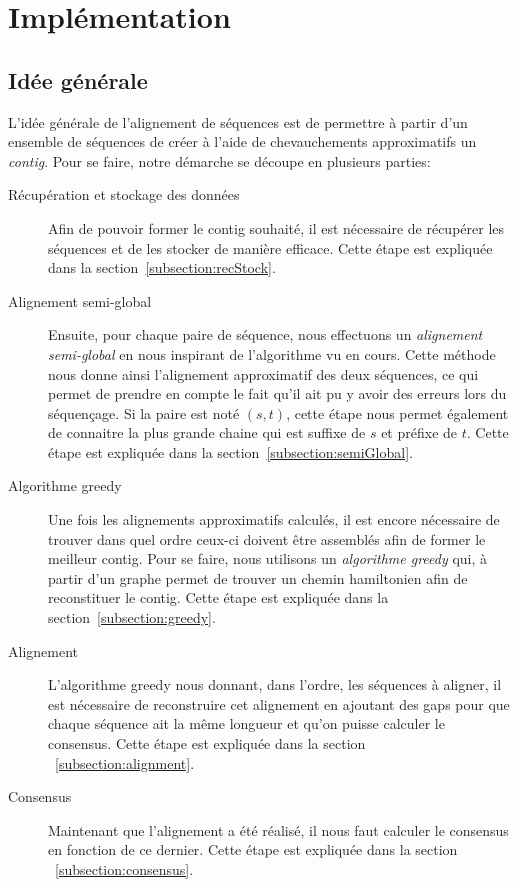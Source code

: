 \section{Implémentation}

\subsection{Idée générale}

	L'idée générale de l'alignement de séquences est de permettre à partir d'un ensemble de séquences de créer à l'aide de chevauchements approximatifs un \emph{contig}. Pour se faire, notre démarche se découpe en plusieurs parties:

	\begin{description}
		\item[Récupération et stockage des données] Afin de pouvoir former le contig souhaité, il est nécessaire de récupérer les séquences et de les stocker de manière efficace. Cette étape est expliquée dans la section~\ref{subsection:recStock}.

		\item[Alignement semi-global] Ensuite, pour chaque paire de séquence,
			nous effectuons un \emph{alignement semi-global} en nous inspirant
			de l'algorithme vu en cours. Cette méthode nous donne ainsi
			l'alignement approximatif des deux séquences, ce qui permet de
			prendre en compte le fait qu'il ait pu y avoir des erreurs lors du
			séquençage. Si la paire est noté $(s, t)$, cette étape nous permet également de connaitre la plus
			grande chaine qui est suffixe de $s$ et préfixe de $t$. Cette étape
			est expliquée dans la section~\ref{subsection:semiGlobal}.

		\item[Algorithme greedy] Une fois les alignements approximatifs
			calculés, il est encore nécessaire de trouver dans quel ordre
			ceux-ci doivent être assemblés afin de former le meilleur contig.
			Pour se faire, nous utilisons un \emph{algorithme greedy} qui, à
			partir d'un graphe permet de trouver un chemin hamiltonien afin de
			reconstituer le contig. Cette étape est expliquée dans la
			section~\ref{subsection:greedy}.

		\item[Alignement]
			L'algorithme greedy nous donnant, dans l'ordre, les séquences à
			aligner, il est nécessaire de reconstruire cet alignement en
			ajoutant des gaps pour que chaque séquence ait la même longueur et
			qu'on puisse calculer le consensus. Cette étape est expliquée dans
			la section ~\ref{subsection:alignment}.

		\item[Consensus]
			Maintenant que l'alignement a été réalisé, il nous faut calculer le
			consensus en fonction de ce dernier. Cette étape est expliquée dans
			la section ~\ref{subsection:consensus}.
	\end{description}

